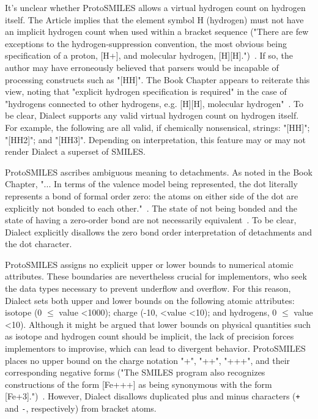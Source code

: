 \documentclass{article}
\def\ttt{\texttt}
\begin{document}
It's unclear whether ProtoSMILES allows a virtual hydrogen count on hydrogen itself. The Article implies that the element symbol H (hydrogen) must not have an implicit hydrogen count when used within a bracket sequence ("There are few exceptions to the hydrogen-suppression convention, the most obvious being specification of a proton, [H+], and molecular hydrogen, [H][H].")~\cite[p.~34]{weininger:1988}. If so, the author may have erroneously believed that parsers would be incapable of processing constructs such as "[HH]". The Book Chapter appears to reiterate this view, noting that "explicit hydrogen specification is required" in the case of "hydrogens connected to other hydrogens, e.g. [H][H], molecular hydrogen"~\cite[p.~97]{weininger:2008}. To be clear, Dialect supports any valid virtual hydrogen count on hydrogen itself. For example, the following are all valid, if chemically nonsensical, strings: "[HH]"; "[HH2]"; and "[HH3]". Depending on interpretation, this feature may or may not render Dialect a superset of SMILES.

ProtoSMILES ascribes ambiguous meaning to detachments. As noted in the Book Chapter, "... In terms of the valence model being represented, the dot literally represents a bond of formal order zero: the atoms on either side of the dot are explicitly not bonded to each other."~\cite[p.~88]{weininger:2008}. The state of not being bonded and the state of having a zero-order bond are not necessarily equivalent~\cite{clark:2011}. To be clear, Dialect explicitly disallows the zero bond order interpretation of detachments and the dot character.

ProtoSMILES assigns no explicit upper or lower bounds to numerical atomic attributes. These boundaries are nevertheless crucial for implementors, who seek the data types necessary to prevent underflow and overflow. For this reason, Dialect sets both upper and lower bounds on the following atomic attributes: isotope (0 $\leq$ value \textless 1000); charge (-10, \textless value \textless 10); and hydrogens, 0 $\leq$ value \textless 10). Although it might be argued that lower bounds on physical quantities such as isotope and hydrogen count should be implicit, the lack of precision forces implementors to improvise, which can lead to divergent behavior. ProtoSMILES places no upper bound on the charge notation "+", "++", "+++", and their corresponding negative forms ("The SMILES program also recognizes constructions of the form [Fe+++] as being synonymous with the form [Fe+3].")~\cite[p.~32]{weininger:1988}. However, Dialect disallows duplicated plus and minus characters (\ttt{+} and \ttt{-}, respectively) from bracket atoms.
\end{document}
